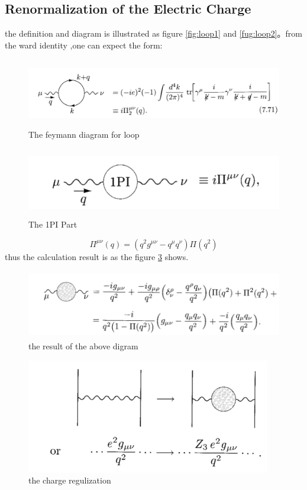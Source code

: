\subsection{Renormalization of the Electric Charge}
the definition and diagram is illustrated as figure \ref{fig:loop1} and \ref{fug:loop2}。from the ward identity ,one can expect the form:\par
\begin{figure}
\begin{center}
\includegraphics[height=3cm]{figures/loop1}
\caption{The feymann diagram for loop}
\label{fig:loop}
\end{center}
\end{figure}
\begin{figure}
\begin{center}
\includegraphics[height=3cm]{figures/loop2}
\caption{The 1PI Part}
\label{fig:loop2}
\end{center}
\end{figure}
\[\Pi^{\mu\nu}(q)=(q^2g^{\mu\nu}-q^\mu q^\nu)\Pi(q^2)\]
thus the calculation result is as the figure \ref{fig:loop3} shows.
\begin{figure}
\begin{center}
\includegraphics[height=3cm]{figures/loop3}
\caption{the result of the above digram}
\label{fig:loop3}
\end{center}
\end{figure}
\begin{figure}
\begin{center}
\includegraphics[height=5cm]{figures/loop4}
\caption{the charge regulization}
\label{fig:loop4}
\end{center}
\end{figure}
